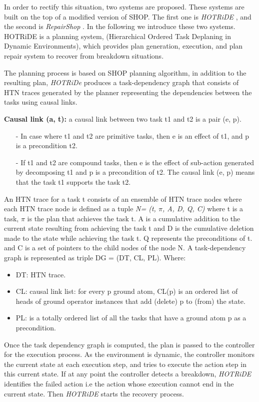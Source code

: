  
In order to rectify this situation, two systems are proposed. These systems are built on the top of a modified version of SHOP. The first one is \textit{HOTRiDE} \cite{ayan2007hotride}, and the second is \textit{RepairShop} \cite{warfield2007adaptation}. In the following we introduce these two systems.
HOTRiDE is a planning system, (Hierarchical Ordered Task Deplaning in Dynamic Environments), which provides plan generation, execution, and plan repair system to recover from breakdown situations. 


The planning process is based on SHOP planning algorithm, in addition to the resulting plan, \textit{HOTRiDe} produces a task-dependency graph that consists of HTN traces generated by the planner  representing the dependencies between the tasks using causal links.

\textbf{Causal link (a, t):} a causal link between two task t1 and t2 is a pair (e, p). 
\begin{itemize}
\item[-]In case where t1 and t2 are primitive tasks, then e is an effect of t1, and p is a precondition t2.
\item[-]If t1 and t2 are compound tasks, then e is the effect of sub-action generated by decomposing t1 and p is a precondition of t2. The causal link (e, p) means that the task t1 supports the task t2.
\end{itemize}


An HTN trace for a task t consists of an ensemble of HTN trace nodes where each HTN trace node is defined as a tuple \textit{N= (t, $\pi$, A, D, Q, C)} where t is a task, $\pi$ is the plan that achieves the task t. A is a cumulative addition to the current state resulting from achieving the task t and D is the cumulative deletion made to the state while achieving the task t. Q represents the preconditions of t. and C is a  set of pointers to the child nodes of the node N.
A task-dependency graph is represented as triple DG = (DT, CL, PL). Where:
\begin{itemize}
\item	DT: HTN trace.
	\item CL: causal link list: for every p ground atom, CL(p) is an ordered list of heads of ground operator instances that add (delete) p to (from) the state. 
	\item PL: is a totally ordered list of all the tasks that have a ground atom p as a precondition. 
\end{itemize}


Once the task dependency graph is computed, the plan is passed to the controller for the execution process. As the environment is dynamic, the controller monitors the current state at each execution step, and tries to execute the action step in this current state.  If at any point the controller detects a breakdown, \textit{HOTRiDE} identifies the failed action i.e the action whose execution cannot end in the current state.  Then \textit{HOTRiDE} starts the recovery process.

